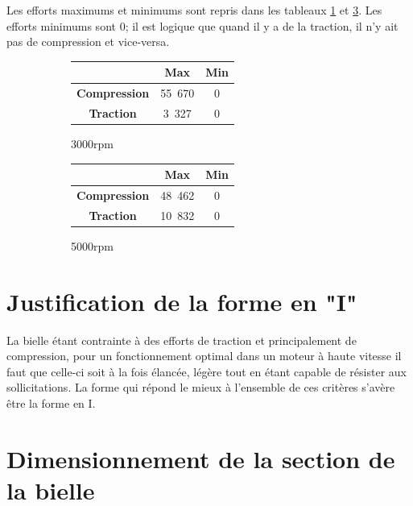 \documentclass{article}
\begin{document}
Les efforts maximums et minimums sont repris dans les tableaux \ref{fig:max_3000rpm} et \ref{fig:max_5000rpm}. Les efforts minimums sont 0; il est logique que quand il y a de la traction, il n'y ait pas de compression et vice-versa.


\begin{figure}[h!]
\centering
    \begin{subfigure}[b]{0.45\textwidth}
    		\begin{tabular}{|c|c|c|}
    		\hline
    		&\textbf{Max}&\textbf{Min}\\
		\hline 
		\textbf{Compression} & \unit{55.670}{\kilo\newton} & 0\\ 
		\hline 
		\textbf{Traction} & \unit{3.327}{\kilo\newton} & 0\\ 
		\hline 
		\end{tabular} 
        \caption{\unit{3000}{rpm}}
        \label{fig:max_3000rpm}
    \end{subfigure}
    \begin{subfigure}[b]{0.45\textwidth}
        \begin{tabular}{|c|c|c|}
        \hline
    		&\textbf{Max}&\textbf{Min}\\
		\hline 
		\textbf{Compression} & \unit{48.462}{\kilo\newton}&0 \\ 
		\hline 
		\textbf{Traction} & \unit{10.832}{\kilo\newton} &0\\ 
		\hline 
		\end{tabular} 
        \caption{\unit{5000}{rpm}}
        \label{fig:max_5000rpm}
    \end{subfigure}
    \caption{}
\end{figure}



\section{Justification de la forme en "I"}
La bielle étant contrainte à des efforts de traction et principalement de compression, pour un fonctionnement optimal dans un moteur à haute vitesse il faut que celle-ci soit à la fois élancée, légère tout en étant capable de résister aux sollicitations. La forme qui répond le mieux à l'ensemble de ces critères s'avère être la forme en I.



\section{Dimensionnement de la section de la bielle}
\end{document}
